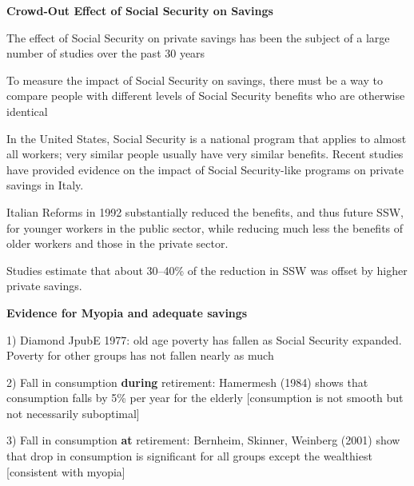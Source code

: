 \documentclass[landscape]{slides}
\begin{document}
\begin{slide}
\begin{center}
{\bf Crowd-Out Effect of Social Security on Savings}
\end{center}

The effect of Social Security on private savings has been the subject of a large number of studies over the past 30 years

To measure the impact of Social Security on savings, there must be a way to compare people with different levels of Social Security benefits who are otherwise identical

\small
In the United States, Social Security is a national program that applies to almost all workers; very similar people usually have very similar benefits. Recent studies have provided evidence on the impact of Social Security-like programs on private savings in Italy.

Italian Reforms in 1992 substantially reduced the benefits, and thus future SSW, for younger workers in the public sector, while reducing much less the benefits of older workers and those in the private sector.

Studies estimate that about 30--40\% of the reduction in SSW was offset by higher private savings.
\end{slide}





\begin{slide}
\begin{center}
{\bf Evidence for Myopia and adequate savings}
\end{center}

1) Diamond JpubE 1977: old age poverty has fallen as Social Security expanded.
Poverty for other groups has not fallen
nearly as much

2) Fall in consumption {\bf during} retirement: Hamermesh (1984)
shows that consumption falls by 5\% per year for the elderly
[consumption is not smooth but not necessarily suboptimal]

3) Fall in consumption {\bf at} retirement: Bernheim, Skinner,
Weinberg (2001) show that drop in consumption is significant for all groups
except the wealthiest [consistent with
myopia]

\end{slide}

\begin{slide}

\end{slide}
\end{document}
